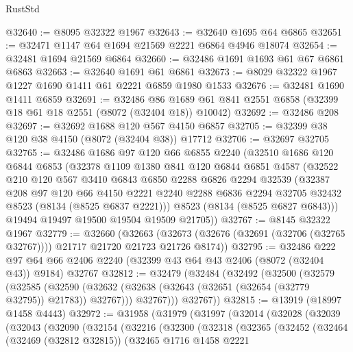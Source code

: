 \begin{lexlean}{RustStd}
\begin{coremodule}
{\begin{coremodule}
{{{{{{{{{{{{{{{{{{{{{{{{{{{{{{{{{{{{{{{{{{{{{{{{{{{{{@32640 := @8095 @32322 @1967
@32643 := @32640 @1695 @64 @6865
@32651 := @32471 @1147 @64 @1694 @21569 @2221 @6864 @4946 @18074
@32654 := @32481 @1694 @21569 @6864
@32660 := @32486 @1691 @1693 @61 @67 @6861 @6863
@32663 := @32640 @1691 @61 @6861
@32673 := @8029 @32322 @1967 @1227 @1690 @1411 @61 @2221 @6859 @1980 @1533
@32676 := @32481 @1690 @1411 @6859
@32691 := @32486
    @86
    @1689
    @61
    @841
    @2551
    @6858
    (@32399 @18 @61 @18 @2551 (@8072 (@32404 @18)) @10042)
@32692 := @32486 @208
@32697 := @32692 @1688 @120 @567 @4150 @6857
@32705 := @32399 @38 @120 @38 @4150 (@8072 (@32404 @38)) @17712
@32706 := @32697 @32705
@32765 := @32486
    @1686
    @97
    @120
    @66
    @6855
    @2240
    (@32510
      @1686
      @120
      @6844
      @6853
      (@32378
        @1109
        @1380
        @841
        @120
        @6844
        @6851
        @4587
        (@32522
          @210
          @120
          @567
          @3410
          @6843
          @6850
          @2288
          @6826
          @2294
          @32539
          (@32387
            @208
            @97
            @120
            @66
            @4150
            @2221
            @2240
            @2288
            @6836
            @2294
            @32705
            @32432
            @8523
            (@8134 (@8525 @6837 @2221)))
          @8523
          (@8134 (@8525 @6827 @6843)))
        @19494
        @19497
        @19500
        @19504
        @19509
        @21705))
@32767 := @8145 @32322 @1967
@32779 := @32660
    (@32663 (@32673 (@32676 (@32691 (@32706 (@32765 @32767)))) @21717 @21720 @21723 @21726 @8174))
@32795 := @32486
    @222
    @97
    @64
    @66
    @2406
    @2240
    (@32399 @43 @64 @43 @2406 (@8072 (@32404 @43)) @9184)
    @32767
@32812 := @32479
    (@32484
      (@32492
        (@32500
          (@32579
            (@32585
              (@32590 (@32632 (@32638 (@32643 (@32651 (@32654 (@32779 @32795)) @21783)) @32767)))
              @32767)))
        @32767))
@32815 := @13919 (@18997 @1458 @4443)
@32972 := @31958
    (@31979
      (@31997
        (@32014
          (@32028
            (@32039
              (@32043
                (@32090
                  (@32154
                    (@32216
                      (@32300
                        (@32318
                          (@32365
                            (@32452
                              (@32464
                                (@32469 (@32812 @32815))
                                (@32465
                                  @1716
                                  @1458
                                  @2221
}}}}}}}}}}}}}}}}}}}}}}}}}}}}}}}}}}}}}}}}}}}}}}}}}}}}}
\end{coremodule}}
\end{coremodule}
\end{lexlean}
